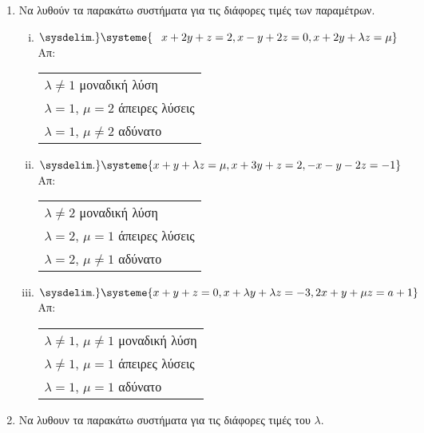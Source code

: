 


\usepackage{systeme}

\setlength{\itemsep}{\baselineskip}


\begin{center}
\end{center}

\vspace{\baselineskip}

\begin{enumerate}
	\setlength{\itemsep}{\baselineskip}
\item Να λυθούν τα παρακάτω συστήματα για τις διάφορες τιμές των παραμέτρων.

	\begin{enumerate}[i)]
		\setlength{\itemsep}{\baselineskip}
\item $\sysdelim.\} \systeme{\phantom{-}x+2y+z=2, x-y+2z=0, x+2y+\lambda z= \mu}$ \hfill Απ: \begin{tabular}{l}
		$\lambda\neq 1$ μοναδική λύση \\
		$\lambda=1$, $\mu=2$ άπειρες λύσεις \\
		$\lambda=1$, $\mu\neq 2$ αδύνατο
	\end{tabular}
		 \item $\sysdelim.\} \systeme{x+y+\lambda z = \mu, x+3y+z = 2, -x-y-2z = -1}$ \hfill Απ: \begin{tabular}{l}
				 $\lambda\neq 2$ μοναδική λύση \\
				 $\lambda=2$, $\mu=1$ άπειρες λύσεις \\
				 $\lambda=2$, $\mu\neq 1$ αδύνατο
			 \end{tabular}

\item $ \sysdelim.\} \systeme{
x + y + z = 0, 
x + \lambda y + \lambda z = -3, 
2x + y + \mu z = a + 1
} $ \hfill Απ: \begin{tabular}{l}
	$ \lambda \neq 1 $, $ \mu \neq 1 $ μοναδική λύση \\
	$ \lambda \neq  1 $, $ \mu = 1 $ άπειρες λύσεις \\
	$ \lambda =1 $, $ \mu = 1 $  αδύνατο  
	

\end{tabular}

	\end{enumerate}

\item Να λυθουν τα παρακάτω συστήματα για τις διάφορες τιμές του $ \lambda $.


\end{enumerate}
